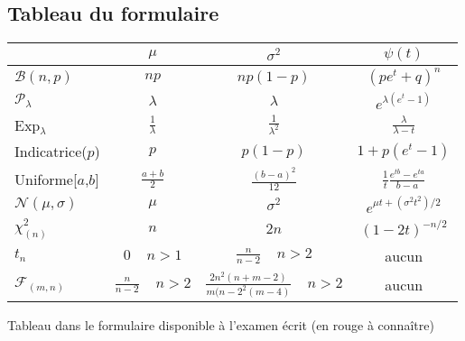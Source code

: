 \subsection{Tableau du formulaire}

\newcommand{\important}[1]{\textcolor[rgb]{1,0,0}{#1}} %

\begin{center}
\begin{tabular}{|l|c|c|c|}

    \hline
                              & $\mu$                           & $\sigma^2$                                      & $\psi(t)$\\
    \hline
    $\mathcal{B}(n,p)$        & \important{$np$}                & \important{$np(1-p)$}                           & $(pe^t+q)^n$\\
    \hline
    $\mathcal{P}_\lambda$     & \important{$\lambda$}           & \important{$\lambda$}                           & $e^{\lambda(e^t-1)}$\\
    \hline
    Exp$_\lambda$             & \important{$\frac{1}{\lambda}$} & $\frac{1}{\lambda^2}$                           & $\frac{\lambda}{\lambda-t}$\\
    \hline
    Indicatrice($p$)          & \important{$p$}                 & \important{$p(1-p)$}                            & $1+p(e^t-1)$\\
    \hline
    Uniforme[$a$,$b$]         & \important{$\frac{a+b}{2}$}     & $\frac{(b-a)^2}{12}$                            & $\frac{1}{t}\frac{e^{tb}-e^{ta}}{b-a}$\\
    \hline
    $\mathcal{N}(\mu,\sigma)$ & \important{$\mu$}               & \important{$\sigma^2$}                          & $e^{\mu t+(\sigma^2t^2)/2}$\\
    \hline
    $\chi^2_{(n)}$            & \important{$n$}                 & $2n$                                            & $(1-2t)^{-n/2}$\\
    \hline
    $t_n$                     & \important{$0\ \ \ \ \ n>1$}    & $\frac{n}{n-2}\ \ \ \ \ n>2$                    & \important{aucun}\\
    \hline
    $\mathcal{F}_{(m,n)}$     & $\frac{n}{n-2}\ \ \ \ \ n>2$    & $\frac{2n^2(n+m-2)}{m(n-2^2(m-4)}\ \ \ \ \ n>2$ & \important{aucun}\\
    \hline

\end{tabular}

Tableau dans le formulaire disponible à l'examen écrit (\important{en rouge à connaître})
\end{center}


